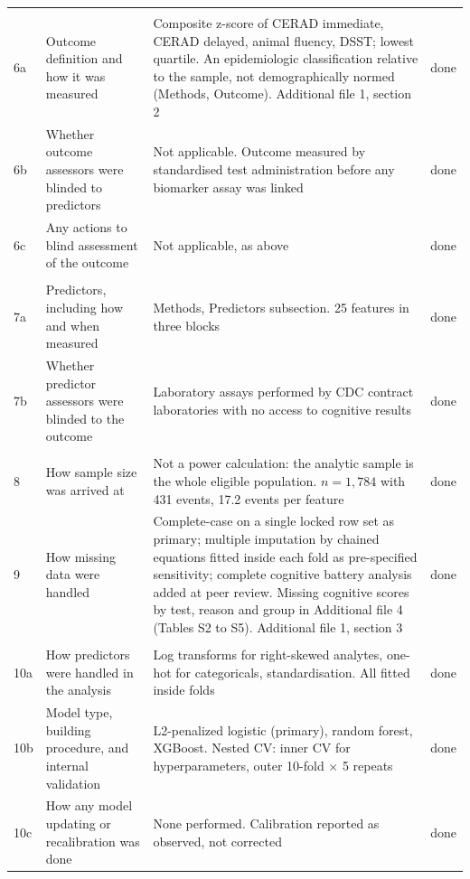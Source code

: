 \documentclass[10pt]{article}
\begin{document}
\begin{longtable}{C{0.7cm}L{4.3cm}L{9cm}C{1.2cm}}
\addlinespace
{} \\
6a & Outcome definition and how it was measured & Composite z-score of CERAD immediate, CERAD delayed, animal fluency, DSST; lowest quartile. An epidemiologic classification relative to the sample, not demographically normed (Methods, Outcome). Additional file 1, section 2 & done \\
6b & Whether outcome assessors were blinded to predictors & Not applicable. Outcome measured by standardised test administration before any biomarker assay was linked & done \\
6c & Any actions to blind assessment of the outcome & Not applicable, as above & done \\
\addlinespace
{} \\
7a & Predictors, including how and when measured & Methods, Predictors subsection. 25 features in three blocks & done \\
7b & Whether predictor assessors were blinded to the outcome & Laboratory assays performed by CDC contract laboratories with no access to cognitive results & done \\
\addlinespace
{} \\
8 & How sample size was arrived at & Not a power calculation: the analytic sample is the whole eligible population. $n=1{,}784$ with 431 events, 17.2 events per feature & done \\
9 & How missing data were handled & Complete-case on a single locked row set as primary; multiple imputation by chained equations fitted inside each fold as pre-specified sensitivity; complete cognitive battery analysis added at peer review. Missing cognitive scores by test, reason and group in Additional file 4 (Tables S2 to S5). Additional file 1, section 3 & done \\
\addlinespace
{} \\
10a & How predictors were handled in the analysis & Log transforms for right-skewed analytes, one-hot for categoricals, standardisation. All fitted inside folds & done \\
10b & Model type, building procedure, and internal validation & L2-penalized logistic (primary), random forest, XGBoost. Nested CV: inner CV for hyperparameters, outer 10-fold $\times$ 5 repeats & done \\
10c & How any model updating or recalibration was done & None performed. Calibration reported as observed, not corrected & done \\

\end{longtable}
\end{document}
